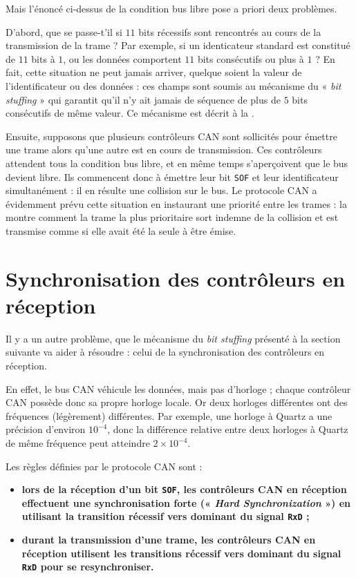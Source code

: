Mais l'énoncé ci-dessus de la condition bus libre pose a priori deux problèmes.

D'abord, que se passe-t'il si $11$ bits récessifs sont rencontrés au cours de la transmission de la trame ? Par exemple, si un identicateur standard est constitué de $11$ bits à $1$, ou les données comportent $11$ bits consécutifs ou plus à $1$ ? En fait, cette situation ne peut jamais arriver, quelque soient la valeur de l'identificateur ou des données : ces champs sont soumis au mécanisme du « \emph{bit stuffing} » qui garantit qu'il n'y ait jamais de séquence de plus de $5$ bits consécutifs de même valeur. Ce mécanisme est décrit à la .

Ensuite, supposons que plusieurs contrôleurs CAN sont sollicités pour émettre une trame alors qu'une autre est en cours de transmission. Ces contrôleurs attendent tous la condition bus libre, et en même temps s'aperçoivent que le bus devient libre. Ils commencent donc à émettre leur bit \texttt{SOF} et leur identificateur simultanément : il en résulte une collision sur le bus. Le protocole CAN a évidemment prévu cette situation en instaurant une priorité entre les trames : la  montre comment la trame la plus prioritaire sort indemne de la collision et est transmise comme si elle avait été la seule à être émise. 








\section{Synchronisation des contrôleurs en réception}

Il y a un autre problème, que le mécanisme du \emph{bit stuffing} présenté à la section suivante va aider à résoudre : celui de la synchronisation des contrôleurs en réception.

En effet, le bus CAN véhicule les données, mais pas d'horloge ; chaque contrôleur CAN possède donc sa propre horloge locale. Or deux horloges différentes ont des fréquences (légèrement) différentes. Par exemple, une horloge à Quartz a une précision d'environ $10^{-4}$, donc la différence relative entre deux horloges à Quartz de même fréquence peut atteindre $2\times10^{-4}$.

Les règles définies par le protocole CAN sont :
\begin{itemize}
\item {\bf lors de la réception d'un bit \texttt{SOF}, les contrôleurs CAN en réception effectuent une synchronisation forte (« \emph{Hard Synchronization} ») en utilisant la transition récessif vers dominant du signal \texttt{RxD} ;} 
\item {\bf durant la transmission d'une trame, les contrôleurs CAN en réception utilisent les transitions récessif vers dominant du signal \texttt{RxD} pour se resynchroniser.} 
\end{itemize}

